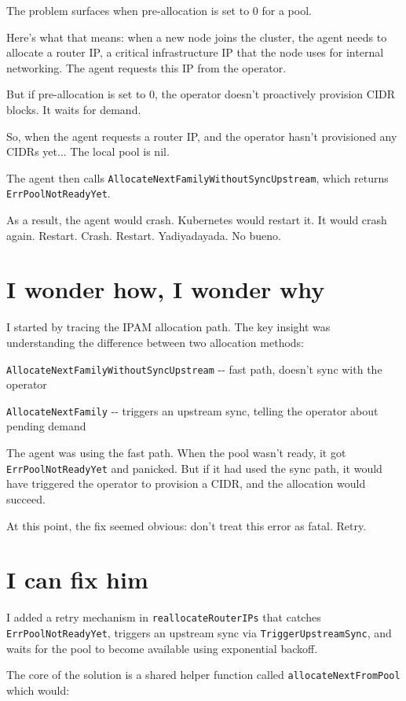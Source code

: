 The problem surfaces when pre-allocation is set to 0 for a pool.

Here's what that means: when a new node joins the cluster, the agent needs to allocate a router IP, a critical infrastructure IP that the node uses for internal networking. The agent requests this IP from the operator.

But if pre-allocation is set to 0, the operator doesn't proactively provision CIDR blocks. It waits for demand.

So, when the agent requests a router IP, and the operator hasn't provisioned any CIDRs yet... The local pool is nil.

The agent then calls \texttt{AllocateNextFamilyWithoutSyncUpstream}, which returns \texttt{ErrPoolNotReadyYet}.

As a result, the agent would crash. Kubernetes would restart it. It would crash again. Restart. Crash. Restart. Yadiyadayada. No bueno.

\section{I wonder how, I wonder why}

I started by tracing the IPAM allocation path. The key insight was understanding the difference between two allocation methods:

\texttt{AllocateNextFamilyWithoutSyncUpstream} -{}- fast path, doesn't sync with the operator

\texttt{AllocateNextFamily} -{}- triggers an upstream sync, telling the operator about pending demand

The agent was using the fast path. When the pool wasn't ready, it got \texttt{ErrPoolNotReadyYet} and panicked. But if it had used the sync path, it would have triggered the operator to provision a CIDR, and the allocation would succeed.

At this point, the fix seemed obvious: don't treat this error as fatal. Retry.

\section{I can fix him}

I added a retry mechanism in \texttt{reallocateRouterIPs} that catches \texttt{ErrPoolNotReadyYet}, triggers an upstream sync via \texttt{TriggerUpstreamSync}, and waits for the pool to become available using exponential backoff.

The core of the solution is a shared helper function called \texttt{allocateNextFromPool} which would:

